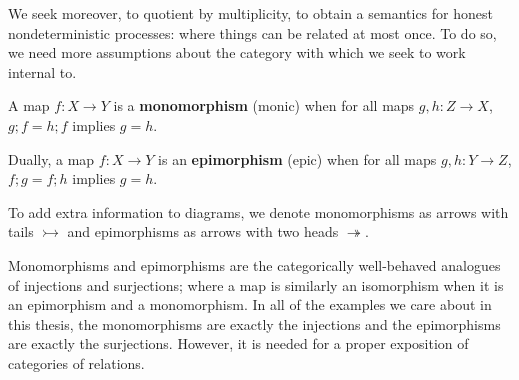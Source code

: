 We seek moreover, to quotient by multiplicity, to obtain a semantics for honest nondeterministic processes: where things can be related at most once.  To do so, we need more assumptions about the category with which we seek to work internal to.
\begin{definition}
A map $f:X\to Y$ is a {\bf monomorphism} (monic) when for all maps $g,h:Z\to X$, $g;f=h;f$ implies $ g=h$.

Dually, a map $f:X\to Y$ is an {\bf epimorphism} (epic) when for all maps $g,h:Y\to Z$, $f;g=f;h$ implies $ g=h$.

To add extra information to diagrams, we denote monomorphisms as arrows with tails $\rightarrowtail$ and epimorphisms as arrows with two heads $\twoheadrightarrow$.  
\end{definition}
Monomorphisms and epimorphisms are the categorically well-behaved analogues of injections and surjections; where a map is similarly an isomorphism when it is an epimorphism and a monomorphism.  In all of the examples we care about in this thesis, the monomorphisms are exactly the injections and the epimorphisms are exactly the surjections.  However, it is needed for a proper exposition of categories of relations.

